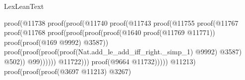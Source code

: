 \begin{lexlean}{LexLeanText}
\begin{coremodule}
                                                                                proof(@11738
                                                                                    proof(proof(@11740
                                                                                          proof(@11743
                                                                                              proof(@11755
                                                                                                  proof(@11767
                                                                                                      proof(@11768
                                                                                                          proof(proof(proof(proof(@1640
                                                                                                                    proof(@11769
                                                                                                                        @11771))
                                                                                                                  proof(proof(@169
                                                                                                                        @9992)
                                                                                                                      @3587))
                                                                                                                proof(proof(proof(proof(Nat.add_le_add_iff_right._simp_1)
                                                                                                                        @9992)
                                                                                                                      @3587)
                                                                                                                    @502))
                                                                                                              @99))))))
                                                                                        @11722)))
                                                                              proof(@9664
                                                                                  @11732)))))
                                                                  @11213)
                                                                proof(proof(proof(@3697 @11213)
                                                                      @3267)

\end{coremodule}
\end{lexlean}
